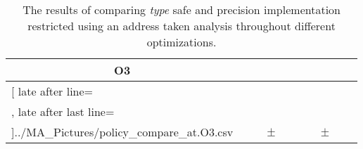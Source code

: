 \begin{table}[!htbp]
{\begin{tabular}{l|c|rcl|c|rcl|c}
\multicolumn{1}{c}{\bfseries O3}
	\\\midrule
	\csvreader[ late after line=\\, late after last line=\\\bottomrule]{../MA_Pictures/policy_compare_at.O3.csv}{
}
	{\csvcolii  &  \csvcoliii & \csvcolxiii & $\pm$ & \csvcolxiv & \csvcolxv & \csvcolxvi & $\pm$ & \csvcolxvii& \csvcolxviii}%

    	\end{tabular}
}
		\caption {The results of comparing \textit{type} safe and precision implementation restricted using an address taken analysis throughout different optimizations.}
		\label{tbl:policycompattype}
\end{table}

